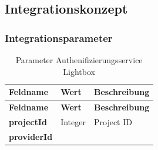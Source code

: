 \hypertarget{integrationskonzept}{\subsection{Integrationskonzept}\label{integrationskonzept}}

\subsubsection{Integrationsparameter}\label{integrationsparameter}

\begin{longtable}[c]{@{}lll@{}}
\caption{Parameter Authenifizierungsservice Lightbox}\tabularnewline
\toprule
\begin{minipage}[b]{0.30\columnwidth}\raggedright\strut
\textbf{Feldname}
\strut\end{minipage} &
\begin{minipage}[b]{0.17\columnwidth}\raggedright\strut
\textbf{Wert}
\strut\end{minipage} &
\begin{minipage}[b]{0.43\columnwidth}\raggedright\strut
\textbf{Beschreibung}
\strut\end{minipage}\tabularnewline
\midrule
\endfirsthead
\toprule
\begin{minipage}[b]{0.30\columnwidth}\raggedright\strut
\textbf{Feldname}
\strut\end{minipage} &
\begin{minipage}[b]{0.17\columnwidth}\raggedright\strut
\textbf{Wert}
\strut\end{minipage} &
\begin{minipage}[b]{0.43\columnwidth}\raggedright\strut
\textbf{Beschreibung}
\strut\end{minipage}\tabularnewline
\midrule
\endhead
\begin{minipage}[t]{0.30\columnwidth}\raggedright\strut
\textbf{projectId}
\strut\end{minipage} &
\begin{minipage}[t]{0.17\columnwidth}\raggedright\strut
Integer
\strut\end{minipage} &
\begin{minipage}[t]{0.43\columnwidth}\raggedright\strut
Project ID
\strut\end{minipage}\tabularnewline
\begin{minipage}[t]{0.30\columnwidth}\raggedright\strut
\textbf{providerId}
\strut\end{minipage} &
\begin{minipage}[t]{0.17\columnwidth}\raggedright\strut

\end{minipage}
\end{longtable}
